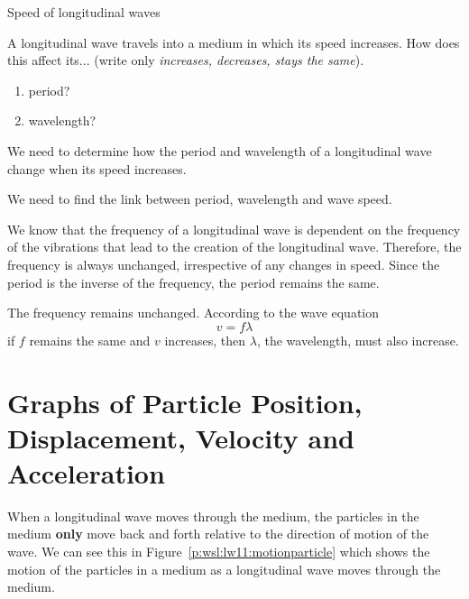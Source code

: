 \begin{wex}
{Speed of longitudinal waves}{A longitudinal wave travels into a medium in which its speed increases.
How does this affect its... (write only \emph{increases, decreases, stays the same}).
\begin{enumerate}
\item period?
\item wavelength?
\end{enumerate}
}{
We need to determine how the period and wavelength of a longitudinal wave change when its speed increases.

We need to find the link between period, wavelength and wave speed.

We know that the frequency of a longitudinal wave is dependent on the frequency of the vibrations that lead to the creation of the longitudinal wave. Therefore, the frequency is always unchanged, irrespective of any changes in speed. Since the period is the inverse of the frequency, the period remains the same.

The frequency remains unchanged. According to the wave equation
\begin{equation*}
v = f\lambda
\end{equation*}
if $f$ remains the same and $v$ increases, then $\lambda$, the wavelength, must also increase.
}
\end{wex}


\section[Graphs of Particle Position, Displacement, Velocity and Acceleration]{\Huge Graphs of Particle Position, Displacement, Velocity and Acceleration}

When a longitudinal wave moves through the medium, the particles in the medium \textbf{only} move back and forth relative to the direction of motion of the wave. We can see this in Figure~\ref{p:wsl:lw11:motionparticle} which shows the motion of the particles in a medium as a longitudinal wave moves through the medium.

